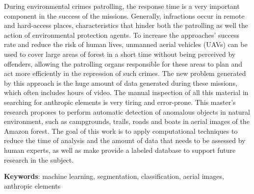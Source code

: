 \begin{resumo}[Abstract]
    During environmental crimes patrolling, the response time is a very important component in the success of the missions. Generally, infractions occur in remote and hard-access places, characteristics that hinder both the patrolling as well the action of environmental protection agents. To increase the approaches' success rate and reduce the risk of human lives, unmanned aerial vehicles (UAVs) can be used to cover large areas of forest in a short time without being perceived by offenders, allowing the patrolling organs responsible for these areas to plan and act more efficiently in the repression of such crimes. The new problem generated by this approach is the huge amount of data generated during these missions, which often includes hours of video. The manual inspection of all this material in searching for anthropic elements is very tiring and error-prone. This master's research proposes to perform automatic detection of anomalous objects in natural environment, such as campgrounds, trails, roads and boats in aerial images of the Amazon forest. The goal of this work is to apply computational techniques to reduce the time of analysis and the amount of data that needs to be assessed by human experts, as well as make provide a labeled database to support future research in the subject.
    
    \vspace{\onelineskip}
    \noindent
    \textbf{Keywords}: machine learning, segmentation, classification, aerial images, anthropic elements
\end{resumo}
